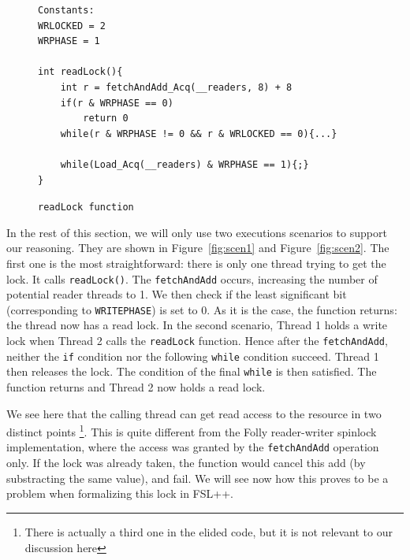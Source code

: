 \begin{figure}
		\begin{lstlisting}
Constants:
WRLOCKED = 2
WRPHASE = 1

int readLock(){
	int r = fetchAndAdd_Acq(__readers, 8) + 8
	if(r & WRPHASE == 0)
		return 0
	while(r & WRPHASE != 0 && r & WRLOCKED == 0){...}

	while(Load_Acq(__readers) & WRPHASE == 1){;}
}

	\end{lstlisting}
	\caption{\texttt{readLock function}}
	\label{fig:codeglibc}
\end{figure}
In the rest of this section, we will only use two executions scenarios to support our reasoning. They are shown in Figure~\ref{fig:scen1} and Figure~\ref{fig:scen2}. The first one is the most straightforward: there is only one thread trying to get the lock. It calls \texttt{readLock()}. The \texttt{fetchAndAdd} occurs, increasing the number of potential reader threads to 1. We then check if the least significant bit (corresponding to \texttt{WRITEPHASE}) is set to 0. As it is the case, the function returns: the thread now has a read lock. In the second scenario, Thread 1 holds a write lock when Thread 2 calls the \texttt{readLock} function. Hence after the \texttt{fetchAndAdd}, neither the \texttt{if} condition nor the following \texttt{while} condition succeed. Thread 1 then releases the lock. The condition of the final \texttt{while} is then satisfied. The function returns and Thread 2 now holds a read lock.

We see here that the calling thread can get read access to the resource in two distinct points \footnote{There is actually a third one in the elided code, but it is not relevant to our discussion here}. This is quite different from the Folly reader-writer spinlock implementation, where the access was granted by the \texttt{fetchAndAdd} operation only. If the lock was already taken, the function would cancel this add (by substracting the same value), and fail. We will see now how this proves to be a problem when formalizing this lock in FSL++.


